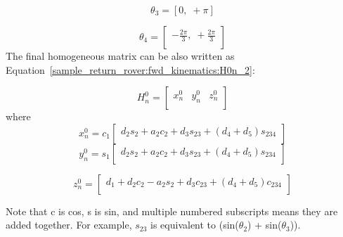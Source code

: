 \begin{equation}
	\theta_{3} = [0,\; + \pi]
	\label{th3} 
\end{equation}	

\begin{equation}
	\theta_{4} = \left[\begin{array}{c}
		-\frac{2\pi}{3},\; +\frac{2\pi}{3} \\
	\end{array}\right] 
\label{th4}
\end{equation}
\newpage
The final homogeneous matrix can be also written as Equation~\ref{sample_return_rover:fwd_kinematics:H0n_2}: 

\begin{equation}
	H^{0}_{n} = \left[\begin{array}{ccc}
		x^{0}_{n} & y^{0}_{n} & z^{0}_{n}\\
	\end{array}\right]
	\label{sample_return_rover:fwd_kinematics:H0n_2}
\end{equation}
where
\begin{equation}
	x^{0}_{n} = c_{1}\left[\begin{array}{c} d_{2}s_{2}+a_{2}c_{2}+d_{3}s_{23}+(d_{4}+d_{5})s_{234}\\
	\end{array}\right]
	\label{sample_return_rover:fwd_kinematics:x0n}
\end{equation}
\begin{equation}
	y^{0}_{n} = s_{1}\left[\begin{array}{c}
		d_{2}s_{2}+a_{2}c_{2}+d_{3}s_{23}+(d_{4}+d_{5})s_{234}\\
	\end{array}\right]
	\label{sample_return_rover:fwd_kinematics:y0n}
\end{equation}

\begin{equation}
	z^{0}_{n} = \left[\begin{array}{c}
		d_{1}+d_{2}c_{2}-a_{2}s_{2}+d_{3}c_{23}+(d_{4}+d_{5})c_{234}\\
	\end{array}\right]
	\label{sample_return_rover:fwd_kinematics:z0n}
\end{equation}

Note that c is cos, s is sin, and multiple numbered subscripts means they are added together. For example, $s_{23}$ is equivalent to (sin(${\theta_{2}}$) + sin(${\theta_{3}}$)).
